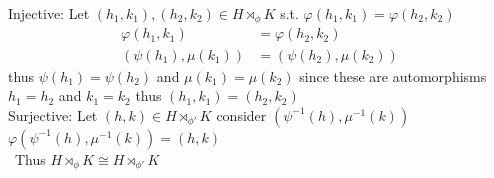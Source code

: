 \documentclass[12pt, letterpaper]{article}
\theoremstyle{definition}
\begin{document}
\begin{enumerate}[(a)]
    Injective: Let $(h_1,k_1),(h_2,k_2) \in H \rtimes_{\phi} K$ s.t. $\varphi(h_1,k_1)=\varphi(h_2,k_2)$
    \begin{align*}
        \varphi(h_1,k_1)&=\varphi(h_2,k_2)\\
        (\psi(h_1),\mu(k_1))&=(\psi(h_2),\mu(k_2))
    \end{align*}
    thus $\psi(h_1)=\psi(h_2)$ and $\mu(k_1)=\mu(k_2)$ since these are automorphisms $h_1=h_2$ and $k_1=k_2$ thus $(h_1,k_1)=(h_2,k_2)$\\
    Surjective: Let $(h,k) \in H \rtimes_{\phi'} K$ consider $(\psi^{-1}(h),\mu^{-1}(k))$\\
    $\varphi(\psi^{-1}(h),\mu^{-1}(k))=(h,k)$\\\
    Thus $H \rtimes_\phi K \cong H \rtimes_{\phi'} K$
\end{enumerate}

\newpage
\end{document}
